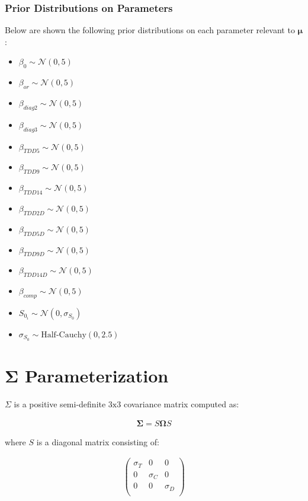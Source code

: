 \subsubsection{Prior Distributions on Parameters}
Below are shown the following prior distributions on each parameter relevant to $\boldsymbol{\mu}$:
\begin{itemize}
    \item $\beta_{0} \sim \mathcal{N}(0,5)$
    \item $\beta_{or} \sim \mathcal{N}(0,5)$
    \item $\beta_{diag2} \sim \mathcal{N}(0,5)$
    \item $\beta_{diag3} \sim \mathcal{N}(0,5)$
    \item $\beta_{TDD5} \sim \mathcal{N}(0,5)$
    \item $\beta_{TDD9} \sim \mathcal{N}(0,5)$
    \item $\beta_{TDD14} \sim \mathcal{N}(0,5)$
    \item $\beta_{TDD2D} \sim \mathcal{N}(0,5)$
    \item $\beta_{TDD5D} \sim \mathcal{N}(0,5)$
    \item $\beta_{TDD9D} \sim \mathcal{N}(0,5)$
    \item $\beta_{TDD14D} \sim \mathcal{N}(0,5)$
    \item $\beta_{comp} \sim \mathcal{N}(0,5)$
    \item $S_{0_i} \sim \mathcal{N}(0,\sigma_{S_0})$
    \item $\sigma_{S_0} \sim \text{Half-Cauchy}(0, 2.5)$
\end{itemize}

\section{$\boldsymbol{\Sigma}$ Parameterization}
$\Sigma$ is a positive semi-definite $3\text{x}3$ covariance matrix computed as:

\begin{align}
   \boldsymbol{\Sigma}=S\boldsymbol{\Omega}S
   \label{eqn:Sigma}
\end{align}

where $S$ is a diagonal matrix consisting of: 

\begin{align}
   \begin{pmatrix}
      \sigma_{T} & 0 & 0 \\
      0 & \sigma_{C} & 0 \\
      0 & 0 & \sigma_{D} \\
   \end{pmatrix}
   \label{eqn:S_1}
\end{align}

